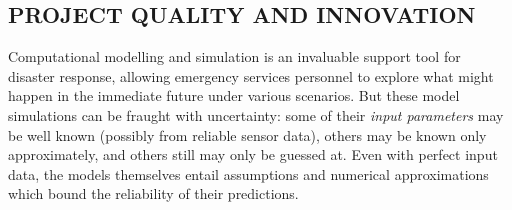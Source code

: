 \subsection*{PROJECT QUALITY AND INNOVATION}


Computational modelling and simulation is an invaluable support tool
for disaster response, allowing emergency services personnel to
explore what might happen in the immediate future under various
scenarios. But these model simulations can be fraught with
uncertainty: some of their \emph{input parameters} may be well known
(possibly from reliable sensor data), others may be known only
approximately, and others still may only be guessed at. Even with
perfect input data, the models themselves entail assumptions and
numerical approximations which bound the reliability of their
predictions.

